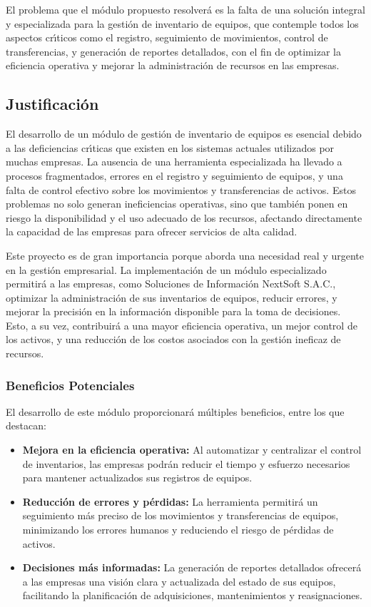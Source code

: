\documentclass[stu, 12pt, letterpaper, donotrepeattitle, floatsintext, natbib]{apa7}
\begin{document}
El problema que el m\'odulo propuesto resolver\'a es la falta de una soluci\'on integral y especializada para la gesti\'on de inventario de equipos, que contemple todos los aspectos cr\'{\i}ticos como el registro,
seguimiento de movimientos, control de transferencias, y generaci\'on de reportes detallados, con el fin de optimizar la eficiencia operativa y mejorar la administraci\'on de recursos en las empresas.
\subsection{Justificaci\'on}
El desarrollo de un m\'odulo de gesti\'on de inventario de equipos es esencial debido a las deficiencias cr\'{\i}ticas que existen en los sistemas actuales utilizados por muchas empresas. La ausencia de una herramienta
especializada ha llevado a procesos fragmentados, errores en el registro y seguimiento de equipos, y una falta de control efectivo sobre los movimientos y transferencias de activos. Estos problemas no solo generan ineficiencias
operativas, sino que tambi\'en ponen en riesgo la disponibilidad y el uso adecuado de los recursos, afectando directamente la capacidad de las empresas para ofrecer servicios de alta calidad.

Este proyecto es de gran importancia porque aborda una necesidad real y urgente en la gesti\'on empresarial. La implementaci\'on de un m\'odulo especializado permitir\'a a las empresas, como Soluciones de Informaci\'on NextSoft
S.A.C., optimizar la administraci\'on de sus inventarios de equipos, reducir errores, y mejorar la precisi\'on en la informaci\'on disponible para la toma de decisiones. Esto, a su vez, contribuir\'a a una mayor eficiencia
operativa, un mejor control de los activos, y una reducci\'on de los costos asociados con la gesti\'on ineficaz de recursos.
\subsubsection{Beneficios Potenciales}
El desarrollo de este m\'odulo proporcionar\'a m\'ultiples beneficios, entre los que destacan:
\begin{itemize}
    \item\textbf{Mejora en la eficiencia operativa:} Al automatizar y centralizar el control de inventarios, las empresas podr\'an reducir el tiempo y esfuerzo necesarios para mantener actualizados sus registros de equipos.
    \item\textbf{Reducci\'on de errores y p\'erdidas:} La herramienta permitir\'a un seguimiento m\'as preciso de los movimientos y transferencias de equipos, minimizando los errores humanos y reduciendo el riesgo de p\'erdidas
          de activos.
    \item\textbf{Decisiones m\'as informadas:} La generaci\'on de reportes detallados ofrecer\'a a las empresas una visi\'on clara y actualizada del estado de sus equipos, facilitando la planificaci\'on de adquisiciones, mantenimientos
          y reasignaciones.
\end{itemize}
\end{document}
